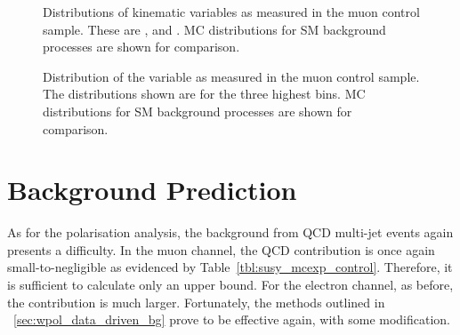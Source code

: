 \begin{figure}
\centering
{}\quad
{}\quad
{}
\caption[Kinematic variables as measured in the muon control sample]{Distributions of kinematic variables as measured in the muon control
  sample. These are  \STlep,
   \MT and 
  \Ptmu. \ac{MC} distributions for \ac{SM} background processes are shown for
  comparison.}
\label{fig:susy_mucontrol_kin}
\end{figure}

\begin{figure}
\centering
{}\quad
{}\quad
{}
\caption[Distribution of the \LP variable as measured in the muon control
sample]{Distribution of the \LP variable as measured in the muon control
  sample. The distributions shown are for the three highest \STlep bins. \ac{MC}
  distributions for \ac{SM} background processes are shown for comparison.}
\label{fig:susy_mucontrol_lp}
\end{figure}

\section{Background Prediction}
As for the \PW polarisation analysis, the background from \ac{QCD} multi-jet
events again presents a difficulty. In the muon channel, the \ac{QCD}
contribution is once again small-to-negligible as evidenced by
Table~\ref{tbl:susy_mcexp_control}. Therefore, it is sufficient to calculate
only an upper bound. For the electron channel, as before, the contribution is
much larger. Fortunately, the methods outlined in
\sec~\ref{sec:wpol_data_driven_bg} prove to be effective again, with some
modification.

